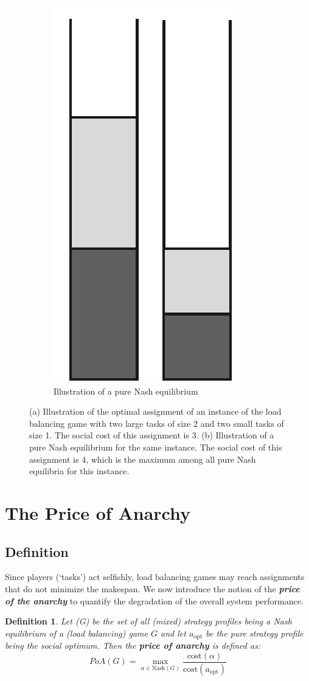 \documentclass[a4paper,11pt]{article}
\newtheorem{definition}[theorem]{Definition}
\newcommand{\cost}{\text{cost}}
\newcommand{\Nash}{\text{Nash}}
\newcommand{\opt}{\text{opt}}
\begin{document}
\begin{figure}
\begin{subfigure}{0.3\textwidth}
                \includegraphics[scale=0.4]{figuurb.pdf}
                \caption{Illustration of a pure Nash equilibrium}
                \label{fig:b}
        \end{subfigure}
        \caption{(a) Illustration of the optimal assignment of an instance of the load balancing game with two large tasks of size 2 and two small tasks of size 1. The social cost of this assignment is 3. (b) Illustration of a pure Nash equilibrium for the same instance. The social cost of this assignment is 4, which is the maximum among all pure Nash equilibria for this instance.}
\end{figure}


\section{The Price of Anarchy}
\subsection{Definition}
Since players (`tasks') act selfishly, load balancing games may reach assignments that do not minimize the makespan. We now introduce the notion of the \emph{\textbf{price of the anarchy}} to quantify the degradation of the overall system performance.
\begin{definition}\cite{10}
Let \Nash(G) be the set of all (mixed) strategy profiles being a Nash equilibrium of a (load balancing) game $G$ and let $a_{\opt}$ be the pure strategy profile being the social optimum. Then the \emph{\textbf{price of anarchy}} is defined as:
$$PoA(G) = \displaystyle\max_{\alpha \in \Nash(G)} {\frac{\cost(\alpha)}{\cost(a_{\opt})}}$$
\end{definition}
\end{document}

